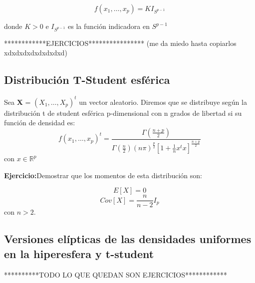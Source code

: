 \documentclass{article}
\theoremstyle{theorem-style}  %
\theoremstyle{definition}
\theoremstyle{example-style}
\begin{document}
	$$f(x_1, \dots, x_p)= KI_{S^{p-1}}$$
	
	donde $K>0$ e $I_{S^{p-1}}$ es la función indicadora en $ S^{p-1}$
	
	************EJERCICIOS**************** (me da miedo hasta copiarlos xdxdxdxdxdxdxdxd)
	
	\subsection{Distribución T-Student esférica}
	
	Sea \textbf{X} = $(X_1, \dots , X_p)^t$ un vector aleatorio. Diremos que se distribuye según la distribución t de student esférica p-dimensional con n grados de libertad si su función de densidad es:
	$$ f(x_1, \dots, x_p)^t = \frac{\Gamma(\frac{n+p}{2})}{\Gamma(\frac{n}{2})(n \pi )^{\frac{p}{2}}[1+\frac{1}{n}x^tx]^{\frac{n+p}{2}}} $$ con $x \in \mathbb{R}^p$
	
	\textbf{Ejercicio:}Demostrar que los momentos de esta distribución son:
	
	$$ E[X]=0$$ $$ Cov[X]= \frac{n}{n-2}I_{p}$$ con $n>2$. 
	
	\subsection{Versiones elípticas de las densidades uniformes en la hiperesfera y t-student}
	
	**********TODO LO QUE QUEDAN SON EJERCICIOS************
	
\end{document}
